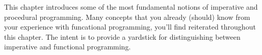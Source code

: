 This chapter introduces some of the most fundamental notions of imperative and
procedural programming.  Many concepts that you already (should) know from your
experience with funcational programming, you'll find reiterated throughout this
chapter.  The intent is to provide a yardstick for distinguishing between
imperative and functional programming.
